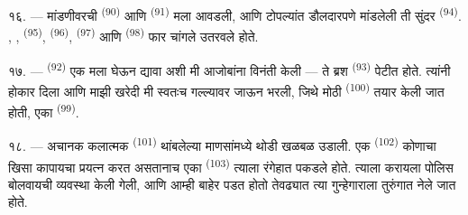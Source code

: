 १६. --- मांडणीवरची  \textsuperscript{(90)} आणि 
\textsuperscript{(91)} मला आवडली, आणि टोपल्यांत डौलदारपणे मांडलेली ती सुंदर
 \textsuperscript{(94)}. , ,
 \textsuperscript{(95)},  \textsuperscript{(96)},
 \textsuperscript{(97)} आणि  \textsuperscript{(98)} फार
चांगले उतरवले होते.

\VUsaut{4.4mm}
\VUsaut{2.8mm}

१७. ---  \textsuperscript{(92)} एक मला घेऊन द्यावा अशी मी
आजोबांना विनंती केली — ते ब्रश  \textsuperscript{(93)} पेटीत
होते. त्यांनी होकार दिला आणि माझी खरेदी मी स्वतःच गल्ल्यावर जाऊन भरली, जिथे मोठी
 \textsuperscript{(100)} तयार केली जात होती, एका 
\textsuperscript{(99)}.

१८. --- अचानक कलात्मक  \textsuperscript{(101)} थांबलेल्या
माणसांमध्ये थोडी खळबळ उडाली. एक  \textsuperscript{(102)} कोणाचा खिसा कापायचा
प्रयत्न करत असतानाच एका  \textsuperscript{(103)} त्याला रंगेहात पकडले
होते. त्याला  करायला पोलिस बोलवायची व्यवस्था केली गेली, आणि आम्ही बाहेर पडत होतो
तेवढ्यात त्या गुन्हेगाराला तुरुंगात नेले जात होते.

\VUsaut{6.0mm}
\VUfilet{22mm}
